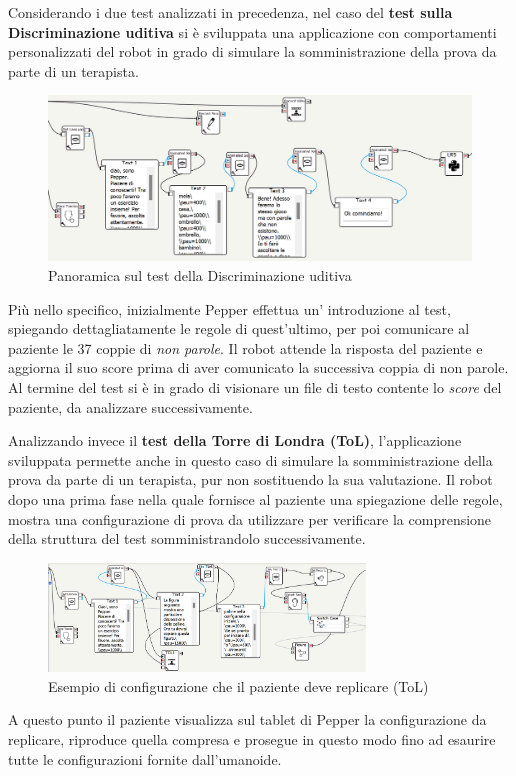 \begin{sloppypar}
{Considerando i due test analizzati in precedenza, nel caso del \textbf{test sulla Discriminazione uditiva} si è sviluppata una applicazione
con comportamenti personalizzati del robot in grado di simulare la
somministrazione della prova da parte di un terapista.\newline
\begin{figure}[H]
\centering
\includegraphics[width=1.1\textwidth]{immagini/tdu.png}
\caption{Panoramica sul test della Discriminazione uditiva}
\end{figure}
\vspace{0.4cm}
Più nello specifico,
inizialmente Pepper effettua un’ introduzione al test, spiegando dettagliatamente
le regole di quest’ultimo, per poi comunicare al paziente le 37 coppie
di \textit{non parole}.\newline
Il robot attende la risposta del paziente e aggiorna il suo
score prima di aver comunicato la successiva coppia di non parole. Al termine
del test si è in grado di visionare un file di testo contente lo \textit{score} del paziente,
da analizzare successivamente.\newline

Analizzando invece il \textbf{test della Torre di Londra (ToL)}, l’applicazione
sviluppata permette anche in questo caso di simulare la somministrazione
della prova da parte di un terapista, pur non sostituendo la sua valutazione.\newline
Il robot dopo una prima fase nella quale fornisce al paziente una spiegazione
delle regole, mostra una configurazione di prova da utilizzare per verificare
la comprensione della struttura del test somministrandolo successivamente.
\vspace{0.6cm}
\begin{figure}[H]
\centering
\includegraphics[width=0.75\textwidth]{immagini/TOL1.png}
\caption{Esempio di configurazione che il paziente deve replicare (ToL)}
\end{figure}
\newpage
A questo punto il paziente visualizza sul tablet di Pepper la configurazione
da replicare, riproduce quella compresa e prosegue in questo modo fino ad
esaurire tutte le configurazioni fornite dall’umanoide.

}
\end{sloppypar}
